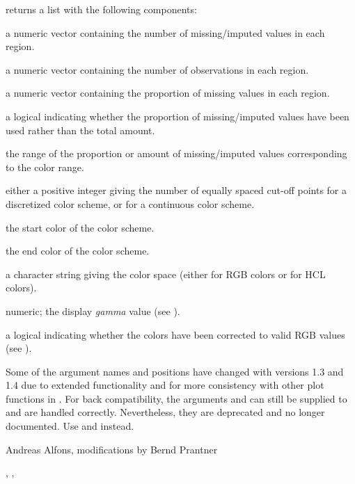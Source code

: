 \begin{Value}
 returns a list with the following components:
\begin{ldescription}
\item[\code{nmiss}] a numeric vector containing the number of missing/imputed values in each 
region.
\item[\code{nobs}] a numeric vector containing the number of observations in each 
region.
\item[\code{pmiss}] a numeric vector containing the proportion of missing values in 
each region.
\item[\code{prop}] a logical indicating whether the proportion of missing/imputed values 
have been used rather than the total amount.
\item[\code{range}] the range of the proportion or amount of missing/imputed values 
corresponding to the color range.
\item[\code{n}] either a positive integer giving the number of equally spaced 
cut-off points for a discretized color scheme, or  for a 
continuous color scheme.
\item[\code{start}] the start color of the color scheme.
\item[\code{end}] the end color of the color scheme.
\item[\code{space}] a character string giving the color space (either  
for RGB colors or  for HCL colors).
\item[\code{gamma}] numeric; the display \emph{gamma} value (see 
).
\item[\code{fixup}] a logical indicating whether the colors have been corrected to 
valid RGB values (see ).
\end{ldescription}
\end{Value}
%
\begin{Note}\relax
Some of the argument names and positions have changed with versions 1.3 and 
1.4 due to extended functionality and for more consistency with other plot 
functions in .  For back compatibility, the arguments 
 and  can still be supplied to  and 
are handled correctly.  Nevertheless, they are deprecated and no longer 
documented.  Use  and  instead.
\end{Note}
%
\begin{Author}\relax
Andreas Alfons, modifications by Bernd Prantner
\end{Author}
%
\begin{SeeAlso}\relax
{}, , 
\end{SeeAlso}
